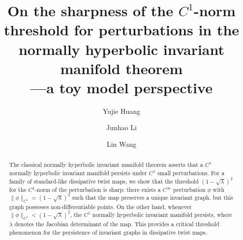 \documentclass{amsart}
\begin{document}
	
	
	\title[On the sharpness of the \(C^1\)-norm threshold for perturbations]{On the sharpness of the \(C^1\)-norm threshold for perturbations
		in the normally hyperbolic invariant manifold theorem\\---a toy model perspective}
	
	\author{Yujie Huang}
	\address{School of Mathematics and Statistics, Beijing Institute of Technology, Beijing 100081, China}
	
	\author{Junhao Li}
	\address{School of Mathematics and Statistics, Beijing Institute of Technology, Beijing 100081, China}
	
	\author{Lin Wang}
	\address{School of Mathematics and Statistics, Beijing Institute of Technology, Beijing 100081, China}
	
	
	
	
	
	
	\begin{abstract}
		
		The classical normally hyperbolic invariant manifold theorem asserts that a \(C^1\) normally hyperbolic invariant manifold persists under \(C^1\) small perturbations. For a family of standard-like dissipative twist maps,  we show that the threshold \((1-\sqrt{\lambda})^2\) for the \(C^1\)-norm of the perturbation is sharp: there exists a $C^\infty$ perturbation \(\phi\) with \(\|\phi\|_{C^1} = (1-\sqrt{\lambda})^2\) such that the map preserves a unique invariant graph, but this graph possesses  non-differentiable points. On the other hand, whenever \(\|\phi\|_{C^1} < (1-\sqrt{\lambda})^2\), the \(C^1\) normally hyperbolic invariant manifold persists, where \(\lambda\) denotes the Jacobian determinant of the map. This provides a critical threshold phenomenon for the persistence of invariant graphs in dissipative twist maps.
	\end{abstract}
	
	
	
	\maketitle
	
	\vspace{2em}
	
\end{document}
